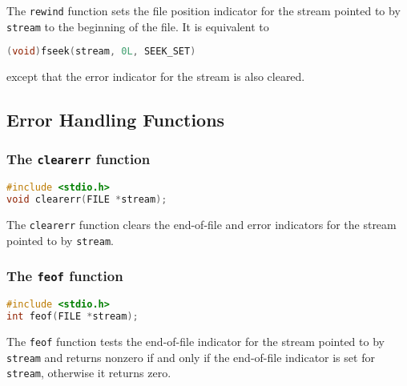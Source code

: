 The \texttt{rewind} function sets the file position indicator for the stream
pointed to by \texttt{stream} to the beginning of the file. It is equivalent to
\lstset{basicstyle=\scriptsize, numbers=left, captionpos=b, tabsize=4}
\begin{lstlisting}[caption=Section \thesection listing \arabic{filecnt},language={C},
breaklines=true,xleftmargin=15pt,label=lst:section\thesection listing\arabic{filecnt}]
(void)fseek(stream, 0L, SEEK_SET)
\end{lstlisting}

except that the error indicator for the stream is also cleared. 

\subsection{Error Handling Functions}
\subsubsection{The \texttt{clearerr} function}
\lstset{basicstyle=\scriptsize, numbers=left, captionpos=b, tabsize=4}
\begin{lstlisting}[caption=Section \thesection listing \arabic{filecnt},language={C},
breaklines=true,xleftmargin=15pt,label=lst:section\thesection listing\arabic{filecnt}]
#include <stdio.h>
void clearerr(FILE *stream);
\end{lstlisting}

The \texttt{clearerr} function clears the end-of-file and error indicators for
the stream pointed to by \texttt{stream}.

\subsubsection{The \texttt{feof} function}
\lstset{basicstyle=\scriptsize, numbers=left, captionpos=b, tabsize=4}
\begin{lstlisting}[caption=Section \thesection listing \arabic{filecnt},language={C},
breaklines=true,xleftmargin=15pt,label=lst:section\thesection listing\arabic{filecnt}]
#include <stdio.h>
int feof(FILE *stream);
\end{lstlisting}

The \texttt{feof} function tests the end-of-file indicator for the stream
pointed to by \texttt{stream} and returns nonzero if and only if the
end-of-file indicator is set for \texttt{stream}, otherwise it returns zero.

